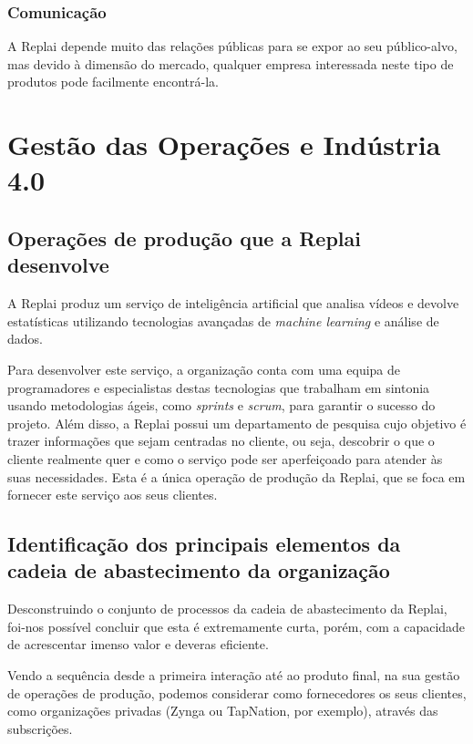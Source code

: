\subsubsection{Comunicação}

A Replai depende muito das relações públicas para se expor ao seu público-alvo, mas devido à dimensão do mercado, qualquer empresa interessada neste tipo de produtos pode facilmente encontrá-la.

\section{Gestão das Operações e Indústria 4.0}

\subsection{Operações de produção que a Replai desenvolve}

A Replai produz um serviço de inteligência artificial que analisa vídeos e devolve estatísticas utilizando tecnologias avançadas de \textit{machine learning} e análise de dados. 

Para desenvolver este serviço, a organização conta com uma equipa de programadores e especialistas destas tecnologias que trabalham em sintonia usando metodologias ágeis, como \textit{sprints} e \textit{scrum}, para garantir o sucesso do projeto. Além disso, a Replai possui um departamento de pesquisa cujo objetivo é trazer informações que sejam centradas no cliente, ou seja, descobrir o que o cliente realmente quer e como o serviço pode ser aperfeiçoado para atender às suas necessidades. Esta é a única operação de produção da Replai, que se foca em fornecer este serviço aos seus clientes.\\

\subsection{Identificação dos principais elementos da cadeia de abastecimento da organização}
  
Desconstruindo o conjunto de processos da cadeia de abastecimento da Replai, foi-nos possível concluir que esta é extremamente curta, porém, com a capacidade de acrescentar imenso valor e deveras eficiente.

Vendo a sequência desde a primeira interação até ao produto final, na sua gestão de operações de produção, podemos considerar como fornecedores os seus clientes, como organizações privadas (Zynga ou TapNation, por exemplo), através das subscrições.
  
